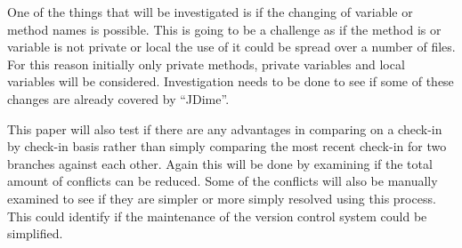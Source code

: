 \documentclass[12pt]{CRPITStyle}
\begin{document}
One of the things that will be investigated is if the changing of variable or method names is possible. This is going to be a challenge as if the method is or variable is not private or local the use of it could be spread over a number of files. For this reason initially only private methods, private variables and local variables will be considered. Investigation needs to be done to see if some of these changes are already covered by ``JDime''. 

This paper will also test if there are any advantages in comparing on a check-in by check-in basis rather than simply comparing the most recent check-in for two branches against each other. Again this will be done by examining if the total amount of conflicts can be reduced. Some of the conflicts will also be manually examined to see if they are simpler or more simply resolved using this process. This could identify if the maintenance of the version control system could be simplified.



\end{document}

